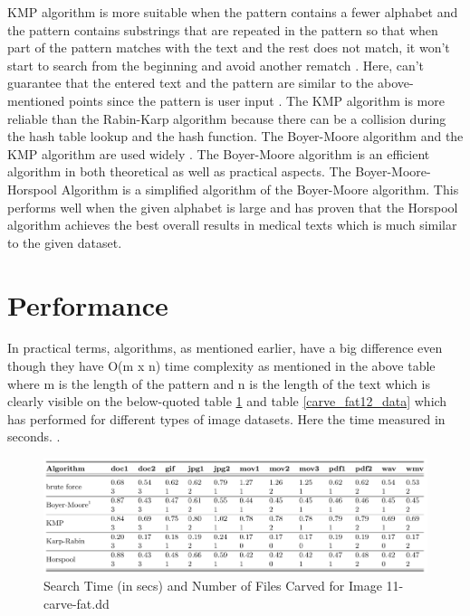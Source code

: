 \documentclass[12pt]{article}
\begin{document}
KMP algorithm is more suitable when the pattern contains a fewer alphabet and the pattern contains substrings that are repeated in the pattern so that when part of the pattern matches with the text and the rest does not match, it won't start to search from the beginning and avoid another rematch \autocite{best_algo_quora}. Here, can't guarantee that the entered text and the pattern are similar to the above-mentioned points since the pattern is user input \autocite{kmp_rabin_karp}. The KMP algorithm is more reliable than the Rabin-Karp algorithm because there can be a collision during the hash table lookup and the hash function. The Boyer-Moore algorithm and the KMP algorithm are used widely \autocite{yi_chang_2015}. The Boyer-Moore algorithm is an efficient algorithm in both theoretical as well as practical aspects. The Boyer-Moore-Horspool Algorithm is a simplified algorithm of the Boyer-Moore algorithm. This performs well when the given alphabet is large and has proven that the Horspool algorithm achieves the best overall results in medical texts \autocite{lovis_baud_2000} which is much similar to the given dataset.

\newpage

\section{Performance}
In practical terms, algorithms, as mentioned earlier, have a big difference even though they have O(m x n) time complexity as mentioned in the above table where m is the length of the pattern and n is the length of the text which is clearly visible on the below-quoted table \ref{carve_fat11_data} and table \ref{carve_fat12_data} which has performed for different types of image datasets. Here the time measured in seconds.
\autocite{yi_chang_2015}.

\begin{figure}[h]
\centering
\includegraphics[width=\textwidth]{./images/Search Time (in secs) for Image “11-carve-fat.dd”.png}
\caption{Search Time (in secs) and Number of Files Carved for Image 11-carve-fat.dd \textcite{yi_chang_2015}}\label{carve_fat11_data}
\end{figure}
\end{document}
